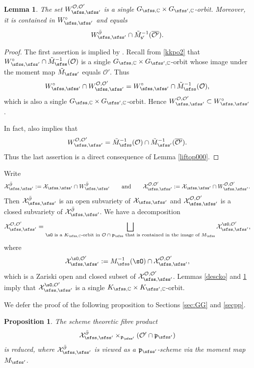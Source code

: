 \documentclass[12pt,a4paper]{amsart}
\newcommand{\CO}{{\mathcal {O}}}
\newcommand{\CX}{{\mathcal {X}}}
\newcommand{\p}{\mathfrak p}
\numberwithin{equation}{section}
\newtheorem{lem}[thm]{Lemma}
\newtheorem{prop}[thm]{Proposition}
\theoremstyle{remark}
\begin{document}
\begin{lem}\label{liftop0}
The set $W_{\sfss, \sfss'}^{\CO, \CO'}$ is  a single $G_{\sfss, \C}\times G_{\sfss',\C}$-orbit. Moreover, it is  contained in $W_{\sfss,\sfss'}^\circ$ and equals
\[
   W_{\sfss, \sfss'}^{\bar \partial} \cap \tilde M_{\mathsf s'}^{-1}(\overline{\CO'}).
\]
\end{lem}
\begin{proof}
The first assertion is implied by \cite[Theorem 3.6]{DKPC}. Recall from \eqref{kkpo2} that $W_{\sfss,\sfss'}^\circ\cap \tilde M_{\sfss}^{-1}(\CO)$ is a single  $G_{\sfss, \C}\times G_{\sfss',\C}$-orbit  whose image under the moment map $\tilde M_{\sfss'}$ equals $\CO'$. Thus
\[
W_{\sfss,\sfss'}^\circ\cap W_{\sfss, \sfss'}^{\CO, \CO'}=W_{\sfss,\sfss'}^\circ\cap \tilde M_{\sfss}^{-1}(\CO),
\]
which  is also a   single  $G_{\sfss, \C}\times G_{\sfss',\C}$-orbit. Hence $W_{\sfss, \sfss'}^{\CO, \CO'}\subset W_{\sfss,\sfss'}^\circ$.

In fact, \cite[Theorem 3.6]{DKPC} also implies that
\[
W_{\sfss, \sfss'}^{\CO, \CO'}=\tilde M_{\sfss}^{-1}(\CO)\cap  \tilde M_{\sfss'}^{-1}(\overline{\CO'}).
\]
Thus the last assertion is a direct consequence of Lemma \ref{liftop000}.

\end{proof}



Write
\[
    \CX_{\sfss, \sfss'}^{\bar \partial}:=\CX_{\sfss, \sfss'} \cap W_{\sfss, \sfss'}^{\bar \partial}\qquad\textrm{and}\qquad \CX_{\sfss, \sfss'}^{\CO, \CO'}:=\CX_{\sfss, \sfss'} \cap W_{\sfss, \sfss'}^{\CO, \CO'}.
   \]
Then  $ \CX_{\sfss, \sfss'}^{\bar \partial}$ is an open subvariety of $ \CX_{\sfss, \sfss'}$ and  $\CX_{\sfss, \sfss'}^{\CO, \CO'}$ is a  closed subvariety of  $\CX_{\sfss, \sfss'}^{\bar \partial}$. We have a decomposition
 \[
   \CX_{\sfss, \sfss'}^{\CO, \CO'}=\bigsqcup_{\sO\textrm{ is a   $K_{\sfss, \C}$-orbit in $ \CO\cap \p_\sfss$ that is contained in the image of $M_\sfss$}}  \CX_{\sfss, \sfss'}^{\sO, \CO'},
 \]
 where
 \[
   \CX_{\sfss, \sfss'}^{\sO, \CO'}:=M_\sfss^{-1}(\sO)\cap \CX_{\sfss, \sfss'}^{\CO, \CO'},
 \]
 which is a Zariski open and closed subset of $\CX_{\sfss, \sfss'}^{\CO, \CO'}$. Lemmas \ref{descko} and \ref{liftop0} imply that $ \CX_{\sfss, \sfss'}^{\sO, \CO'}$ is a single $K_{\sfss, \C}\times K_{\sfss',\C}$-orbit.

\medskip

We defer the proof of the following proposition to Sections \ref{sec:GG} and \ref{secpp}.
\begin{prop}\label{propreduced}
 The scheme theoretic  fibre product
\[
\CX_{\sfss, \sfss'}^{\bar \partial}\times_{\p_{\sfss'}} ({\CO'}\cap \p_{\sfss'})
\]
is reduced, where $\CX_{\sfss, \sfss'}^{\bar \partial}$ is viewed as a $\p_{\sfss'}$-scheme via the moment map $M_{\sfss'}$.
\end{prop}
\end{document}
